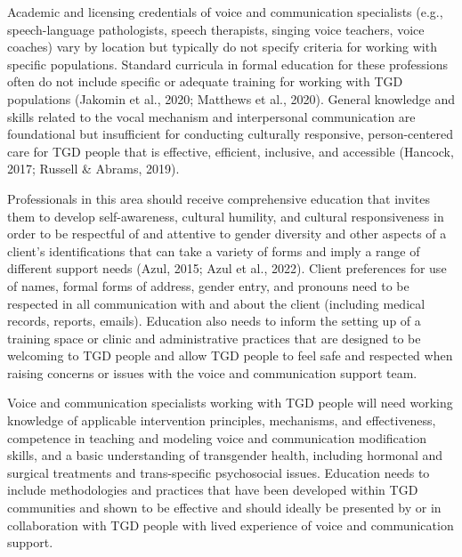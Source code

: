 \documentclass[
]{book}
\begin{document}
Academic and licensing credentials of voice and
communication specialists (e.g., speech-language
pathologists, speech therapists, singing voice teachers, voice coaches) vary by location but typically
do not specify criteria for working with specific
populations. Standard curricula in formal education for these professions often do not include
specific or adequate training for working with
TGD populations (Jakomin et al., 2020; Matthews
et al., 2020). General knowledge and skills related
to the vocal mechanism and interpersonal communication are foundational but insufficient for
conducting culturally responsive, person-centered
care for TGD people that is effective, efficient,
inclusive, and accessible (Hancock, 2017; Russell
\& Abrams, 2019).

Professionals in this area should receive comprehensive education that invites them to develop
self-awareness, cultural humility, and cultural
responsiveness in order to be respectful of and
attentive to gender diversity and other aspects
of a client's identifications that can take a variety
of forms and imply a range of different support
needs (Azul, 2015; Azul et al., 2022). Client
preferences for use of names, formal forms of
address, gender entry, and pronouns need to be
respected in all communication with and about
the client (including medical records, reports,
emails). Education also needs to inform the setting up of a training space or clinic and administrative practices that are designed to be
welcoming to TGD people and allow TGD people to feel safe and respected when raising concerns or issues with the voice and communication
support team.

Voice and communication specialists working
with TGD people will need working knowledge
of applicable intervention principles, mechanisms,
and effectiveness, competence in teaching and
modeling voice and communication modification
skills, and a basic understanding of transgender
health, including hormonal and surgical treatments and trans-specific psychosocial issues.
Education needs to include methodologies and
practices that have been developed within TGD
communities and shown to be effective and
should ideally be presented by or in collaboration
with TGD people with lived experience of voice
and communication support.
\end{document}
